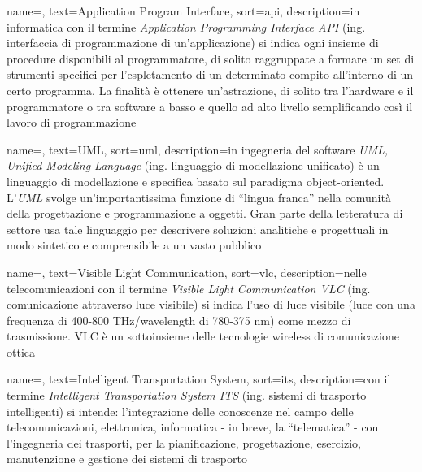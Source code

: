 





 {
    name=,
    text=Application Program Interface,
    sort=api,
    description={in informatica con il termine \emph{Application Programming Interface API} (ing. interfaccia di programmazione di un'applicazione) si indica ogni insieme di procedure disponibili al programmatore, di solito raggruppate a formare un set di strumenti specifici per l'espletamento di un determinato compito all'interno di un certo programma. La finalità è ottenere un'astrazione, di solito tra l'hardware e il programmatore o tra software a basso e quello ad alto livello semplificando così il lavoro di programmazione}
}

 {
    name=,
    text=UML,
    sort=uml,
    description={in ingegneria del software \emph{UML, Unified Modeling Language} (ing. linguaggio di modellazione unificato) è un linguaggio di modellazione e specifica basato sul paradigma object-oriented. L'\emph{UML} svolge un'importantissima funzione di ``lingua franca'' nella comunità della progettazione e programmazione a oggetti. Gran parte della letteratura di settore usa tale linguaggio per descrivere soluzioni analitiche e progettuali in modo sintetico e comprensibile a un vasto pubblico}
}

 {
    name=,
    text=Visible Light Communication,
    sort=vlc,
    description={nelle telecomunicazioni con il termine \emph{Visible Light Communication VLC} (ing. comunicazione attraverso luce visibile) si indica l'uso di luce visibile (luce con una frequenza di 400-800 THz/wavelength di 780-375 nm) come mezzo di trasmissione. VLC è un sottoinsieme delle tecnologie wireless di comunicazione ottica}
}

 {
    name=,
    text=Intelligent Transportation System,
    sort=its,
    description={con il termine \emph{Intelligent Transportation System ITS} (ing. sistemi di trasporto intelligenti) si intende: l'integrazione delle conoscenze nel campo delle telecomunicazioni, elettronica, informatica - in breve, la “telematica” - con l'ingegneria dei trasporti, per la pianificazione, progettazione, esercizio, manutenzione e gestione dei sistemi di trasporto}
}

